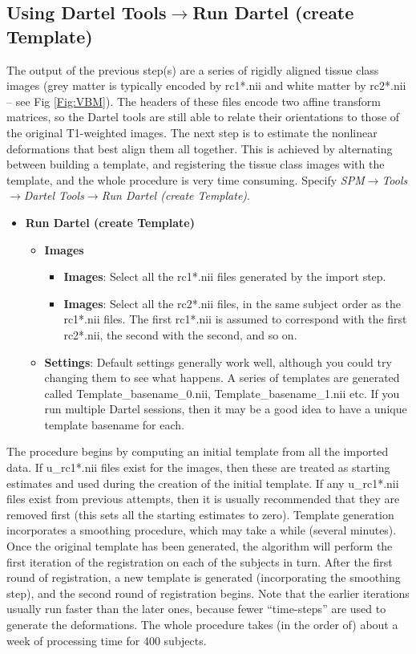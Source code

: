 \subsection{Using Dartel Tools$\rightarrow$Run Dartel (create Template)}
The output of the previous step(s) are a series of rigidly aligned tissue class images (grey matter is typically encoded by rc1*.nii and white matter by rc2*.nii -- see Fig \ref{Fig:VBM}).
The headers of these files encode two affine transform matrices, so the Dartel tools are still able to relate their orientations to those of the original T1-weighted images.
The next step is to estimate the nonlinear deformations that best align them all together.
This is achieved by alternating between building a template, and registering the tissue class images with the template, and the whole procedure is very time consuming.
Specify \emph{SPM$\rightarrow$Tools$\rightarrow$Dartel Tools$\rightarrow$Run Dartel (create Template)}.
\begin{itemize}
\item{{\bf Run Dartel (create Template)}
  \begin{itemize}
  \item{{\bf Images}
    \begin{itemize}
    \item{{\bf Images}: Select all the rc1*.nii files generated by the import step.
    }
    \item{{\bf Images}: Select all the rc2*.nii files, in the same subject order as the rc1*.nii files. The first rc1*.nii is assumed to correspond with the first rc2*.nii, the second with the second, and so on.
    }
    \end{itemize}
  }
  \item{{\bf Settings}: Default settings generally work well, although you could try changing them to see what happens. A series of templates are generated called Template\_basename\_0.nii, Template\_basename\_1.nii etc.  If you run multiple Dartel sessions, then it may be a good idea to have a unique template basename for each. 
  }
  \end{itemize}
}
\end{itemize}
The procedure begins by computing an initial template from all the imported data.
If u\_rc1*.nii files exist for the images, then these are treated as starting estimates and used during the creation of the initial template.  If any u\_rc1*.nii files exist from previous attempts, then it is usually recommended that they are removed first (this sets all the starting estimates to zero).
Template generation incorporates a smoothing procedure, which may take a while (several minutes).
Once the original template has been generated, the algorithm will perform the first iteration of the registration on each of the subjects in turn.
After the first round of registration, a new template is generated (incorporating the smoothing step), and the second round of registration begins.
Note that the earlier iterations usually run faster than the later ones, because fewer ``time-steps'' are used to generate the deformations.
The whole procedure takes (in the order of) about a week of processing time for 400 subjects.

